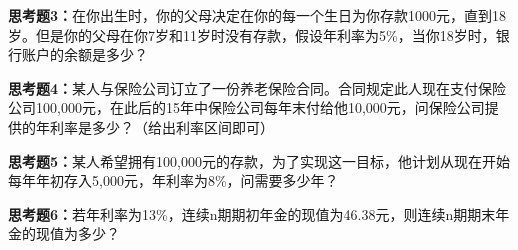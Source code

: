 \noindent \textbf{思考题3：}在你出生时，你的父母决定在你的每一个生日为你存款1000元，直到18岁。但是你的父母在你7岁和11岁时没有存款，假设年利率为5\%，当你18岁时，银行账户的余额是多少？

\noindent \textbf{思考题4：}某人与保险公司订立了一份养老保险合同。合同规定此人现在支付保险公司100,000元，在此后的15年中保险公司每年末付给他10,000元，问保险公司提供的年利率是多少？（给出利率区间即可）

\noindent \textbf{思考题5：}某人希望拥有100,000元的存款，为了实现这一目标，他计划从现在开始每年年初存入5,000元，年利率为8\%，问需要多少年？

\noindent \textbf{思考题6：}若年利率为13\%，连续n期期初年金的现值为46.38元，则连续n期期末年金的现值为多少？